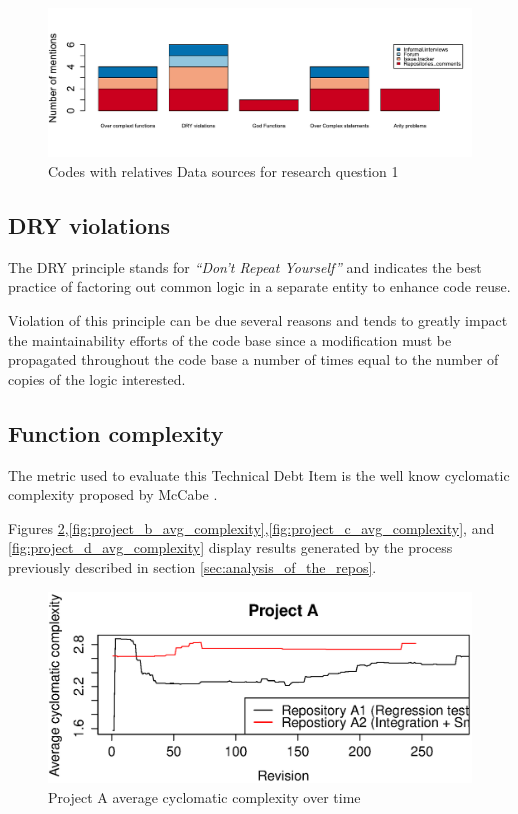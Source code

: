 \begin{figure}[!htbp]
    \centering
    \includegraphics[width=\textwidth,keepaspectratio]{figure/results/rq1/sources.pdf}
    \caption{Codes with relatives Data sources for research question 1}
    \label{fig:rq1_sources}
\end{figure}

\FloatBarrier

\subsection{DRY violations}
The DRY principle stands for \textit{``Don't Repeat Yourself''} and indicates the best practice of factoring out common logic in a separate entity to enhance code reuse.

Violation of this principle can be due several reasons and tends to greatly impact the maintainability efforts of the code base since a modification must be propagated throughout the code base a number of times equal to the number of copies of the logic interested.
    
\subsection{Function complexity}
The metric used to evaluate this Technical Debt Item is the well know cyclomatic complexity proposed by McCabe \cite{cyclomatic_complexity}.


    Figures \ref{fig:project_a_avg_complexity},\ref{fig:project_b_avg_complexity},\ref{fig:project_c_avg_complexity}, and \ref{fig:project_d_avg_complexity} display results generated by the process previously described in section \ref{sec:analysis_of_the_repos}.

    
\begin{figure}[!htbp]
    \centering
    \includegraphics[width=\textwidth,keepaspectratio]{figure/results/rq1/project_a_avg_complexity.eps}
    \caption{Project A average cyclomatic complexity over time}
    \label{fig:project_a_avg_complexity}
\end{figure}

